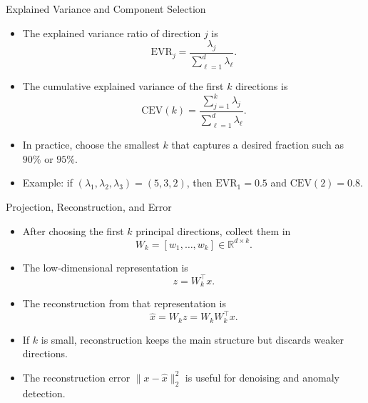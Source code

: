 \begin{frame}{Explained Variance and Component Selection}
\begin{itemize}
  \item The explained variance ratio of direction $j$ is
  \begin{equation}
    \mathrm{EVR}_j = \frac{\lambda_j}{\sum_{\ell=1}^d \lambda_\ell}.
    \label{eq:explained-variance-ratio}
  \end{equation}
  \pause
  \item The cumulative explained variance of the first $k$ directions is
  \begin{equation}
    \mathrm{CEV}(k) = \frac{\sum_{j=1}^k \lambda_j}{\sum_{\ell=1}^d \lambda_\ell}.
    \label{eq:cumulative-explained-variance}
  \end{equation}
  \pause
  \item In practice, choose the smallest $k$ that captures a desired fraction such as $90\%$ or $95\%$.
  \pause
  \item \footnotesize Example: if $(\lambda_1,\lambda_2,\lambda_3)=(5,3,2)$, then $\mathrm{EVR}_1=0.5$ and $\mathrm{CEV}(2)=0.8$.
\end{itemize}
\end{frame}

\begin{frame}{Projection, Reconstruction, and Error}
\small
\begin{itemize}
  \item After choosing the first $k$ principal directions, collect them in
  \[
    W_k = [w_1,\dots,w_k] \in \mathbb{R}^{d\times k}.
  \]
  \pause
  \item The low-dimensional representation is
  \begin{equation}
    z = W_k^\top x.
    \label{eq:pca-project-k}
  \end{equation}
  \pause
  \item The reconstruction from that representation is
  \begin{equation}
    \hat{x} = W_k z = W_k W_k^\top x.
    \label{eq:pca-reconstruct}
  \end{equation}
  \pause
  \item If $k$ is small, reconstruction keeps the main structure but discards weaker directions.
  \pause
  \item The reconstruction error $\|x-\hat{x}\|_2^2$ is useful for denoising and anomaly detection.
\end{itemize}
\end{frame}

